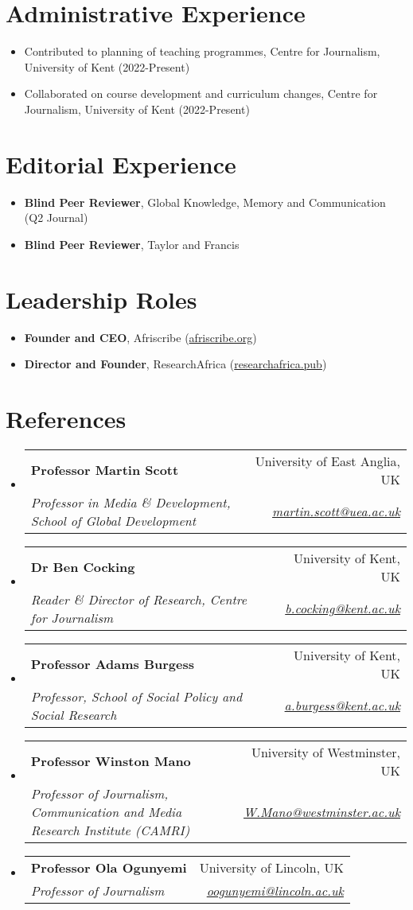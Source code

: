\documentclass[a4paper,11pt]{article}
\makeatletter
\newcommand{\resumeItem}[1]{
  \item\small{
    {#1 \vspace{-2pt}}
  }
}
\newcommand{\resumeSubheading}[4]{
  \vspace{-2pt}\item
    \begin{tabular*}{0.97\textwidth}[t]{l@{\extracolsep{\fill}}r}
      \textbf{#1} & #2 \\
      \textit{\small#3} & \textit{\small #4} \\
    \end{tabular*}\vspace{-7pt}
}
\newcommand{\resumeSubHeadingListStart}{\begin{itemize}[leftmargin=0.15in, label={}]}
\newcommand{\resumeSubHeadingListEnd}{\end{itemize}}
\newcommand{\resumeItemListStart}{\begin{itemize}}
\newcommand{\resumeItemListEnd}{\end{itemize}\vspace{-5pt}}
\makeatother
\begin{document}
\section{Administrative Experience}
    \resumeItemListStart
        \resumeItem{Contributed to planning of teaching programmes, Centre for Journalism, University of Kent (2022-Present)}
        \resumeItem{Collaborated on course development and curriculum changes, Centre for Journalism, University of Kent (2022-Present)}
    \resumeItemListEnd

\section{Editorial Experience}
    \resumeItemListStart
        \resumeItem{\textbf{Blind Peer Reviewer}, Global Knowledge, Memory and Communication (Q2 Journal)}
        \resumeItem{\textbf{Blind Peer Reviewer}, Taylor and Francis}
    \resumeItemListEnd

\section{Leadership Roles}
    \resumeItemListStart
        \resumeItem{\textbf{Founder and CEO}, Afriscribe (\href{https://afriscribe.org}{afriscribe.org})}
        \resumeItem{\textbf{Director and Founder}, ResearchAfrica (\href{https://researchafrica.pub}{researchafrica.pub})}
    \resumeItemListEnd

\section{References}
  \resumeSubHeadingListStart
    \resumeSubheading
      {Professor Martin Scott}{University of East Anglia, UK}
      {Professor in Media \& Development, School of Global Development}{\href{mailto:martin.scott@uea.ac.uk}{martin.scott@uea.ac.uk}}

    \resumeSubheading
      {Dr Ben Cocking}{University of Kent, UK}
      {Reader \& Director of Research, Centre for Journalism}{\href{mailto:b.cocking@kent.ac.uk}{b.cocking@kent.ac.uk}}

    \resumeSubheading
      {Professor Adams Burgess}{University of Kent, UK}
      {Professor, School of Social Policy and Social Research}{\href{mailto:a.burgess@kent.ac.uk}{a.burgess@kent.ac.uk}}

    \resumeSubheading
      {Professor Winston Mano}{University of Westminster, UK}
      {Professor of Journalism, Communication and Media Research Institute (CAMRI)}{\href{mailto:W.Mano@westminster.ac.uk}{W.Mano@westminster.ac.uk}}

    \resumeSubheading
      {Professor Ola Ogunyemi}{University of Lincoln, UK}
      {Professor of Journalism}{\href{mailto:oogunyemi@lincoln.ac.uk}{oogunyemi@lincoln.ac.uk}}
  \resumeSubHeadingListEnd
\end{document}
